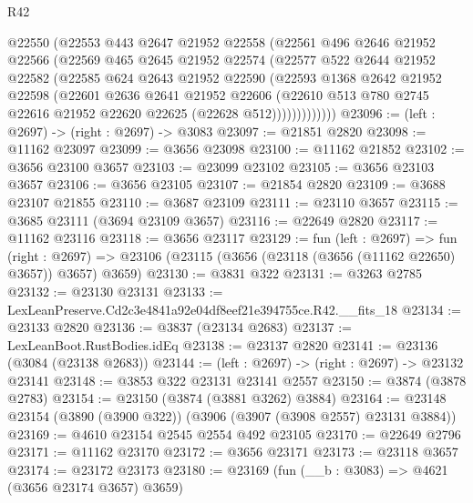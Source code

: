 \begin{lexlean}{R42}
\begin{coremodule}
            @22550
            (@22553
              @443
              @2647
              @21952
              @22558
              (@22561
                @496
                @2646
                @21952
                @22566
                (@22569
                  @465
                  @2645
                  @21952
                  @22574
                  (@22577
                    @522
                    @2644
                    @21952
                    @22582
                    (@22585
                      @624
                      @2643
                      @21952
                      @22590
                      (@22593
                        @1368
                        @2642
                        @21952
                        @22598
                        (@22601
                          @2636
                          @2641
                          @21952
                          @22606
                          (@22610
                            @513
                            @780
                            @2745
                            @22616
                            @21952
                            @22620
                            @22625
                            (@22628 @512)))))))))))))
@23096 := (left : @2697) -> (right : @2697) -> @3083
@23097 := @21851 @2820
@23098 := @11162 @23097
@23099 := @3656 @23098
@23100 := @11162 @21852
@23102 := @3656 @23100 @3657
@23103 := @23099 @23102
@23105 := @3656 @23103 @3657
@23106 := @3656 @23105
@23107 := @21854 @2820
@23109 := @3688 @23107 @21855
@23110 := @3687 @23109
@23111 := @23110 @3657
@23115 := @3685 @23111 (@3694 @23109 @3657)
@23116 := @22649 @2820
@23117 := @11162 @23116
@23118 := @3656 @23117
@23129 := fun (left : @2697) =>
  fun (right : @2697) => @23106 (@23115 (@3656 (@23118 (@3656 (@11162 @22650) @3657)) @3657) @3659)
@23130 := @3831 @322
@23131 := @3263 @2785
@23132 := @23130 @23131
@23133 := LexLeanPreserve.Cd2c3e4841a92e04df8eef21e394755ce.R42.__fits_18
@23134 := @23133 @2820
@23136 := @3837 (@23134 @2683)
@23137 := LexLeanBoot.RustBodies.idEq
@23138 := @23137 @2820
@23141 := @23136 (@3084 (@23138 @2683))
@23144 := (left : @2697) -> (right : @2697) -> @23132 @23141
@23148 := @3853 @322 @23131 @23141 @2557
@23150 := @3874 (@3878 @2783)
@23154 := @23150 (@3874 (@3881 @3262) @3884)
@23164 := @23148 @23154 (@3890 (@3900 @322)) (@3906 (@3907 (@3908 @2557) @23131 @3884))
@23169 := @4610 @23154 @2545 @2554 @492 @23105
@23170 := @22649 @2796
@23171 := @11162 @23170
@23172 := @3656 @23171
@23173 := @23118 @3657
@23174 := @23172 @23173
@23180 := @23169 (fun (__b : @3083) => @4621 (@3656 @23174 @3657) @3659)

\end{coremodule}
\end{lexlean}
